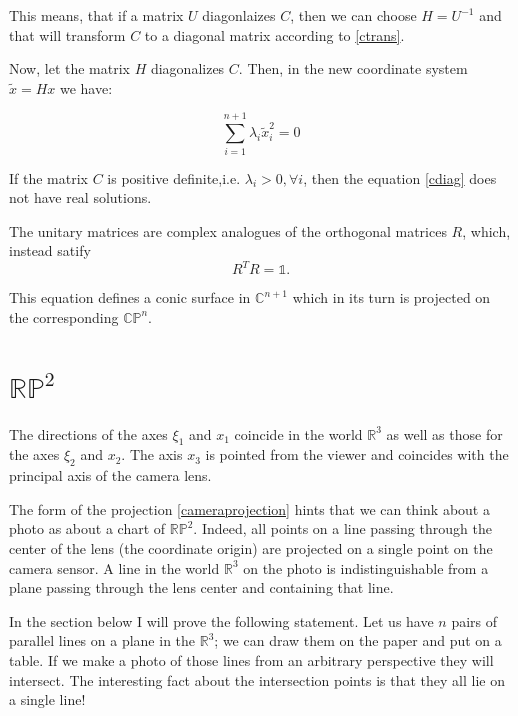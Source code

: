 \documentclass[a4paper,10pt]{article}
\begin{document}
This means, that if a matrix $U$ diagonlaizes $C$, then we can choose $H=U^{-1}$ and that will transform $C$ to a diagonal matrix according to \eqref{ctrans}. 

Now, let the matrix $H$ diagonalizes $C$. Then, in the new coordinate system $\tilde{x} = H x$ we have:

\begin{equation}
 \sum\limits_{i=1}^{n+1} \lambda_i \tilde{x}_i^2 = 0\label{cdiag}
\end{equation}

If the matrix $C$ is positive definite,i.e. $\lambda_i> 0, \forall i$, then the equation \eqref{cdiag} does not have real solutions.

The unitary matrices are complex analogues of the orthogonal matrices $R$, which, instead satify 
\begin{equation}
 R^TR=\mathbb{1}.
\end{equation}


This equation defines a conic surface in $\mathbb{C}^{n+1}$ which in its turn is projected on the corresponding $\mathbb{CP}^n$.  





\section{$\mathbb{RP}^2$}


The directions of the axes $\xi_1$ and $x_1$ coincide in the world $\mathbb{R}^3$ as well as those for the axes  $\xi_2$ and $x_2$. The axis $x_3$ is pointed from the viewer and coincides with the principal axis of the camera lens. 

The form of the projection \eqref{cameraprojection} hints that we can think about a photo as about a chart of $\mathbb{RP}^2$. Indeed, all points on a line passing through the center of the lens (the coordinate origin) are projected on a single point on the camera sensor. A line in the world $\mathbb{R}^3$ on the photo is indistinguishable from a plane passing through the lens center and containing that line.  

In the section below I will prove the following statement. Let us have $n$ pairs of parallel lines on a plane in the $\mathbb{R}^3$; we can draw them on the paper and put on a table. If we make a photo of those lines from an arbitrary perspective they will intersect. The interesting fact about  the intersection points is that they all lie on a single line!
\end{document}
